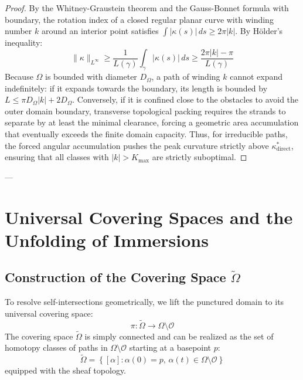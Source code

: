 \documentclass[11pt,reqno]{amsart}
\theoremstyle{definition}
\newcommand{\Cover}{\widetilde{\Omega}}
\numberwithin{equation}{section}
\begin{document}
\begin{proof}
By the Whitney-Graustein theorem \cite{whitney1936} and the Gauss-Bonnet formula with boundary, the rotation index of a closed regular planar curve with winding number $k$ around an interior point satisfies $\int |\kappa(s)|\,ds \ge 2\pi |k|$. 
By H\"older's inequality:
\begin{equation}
\|\kappa\|_{L^\infty} \ge \frac{1}{L(\gamma)} \int_\gamma |\kappa(s)|\,ds \ge \frac{2\pi |k| - \pi}{L(\gamma)}
\end{equation}
Because $\Omega$ is bounded with diameter $D_{\Omega}$, a path of winding $k$ cannot expand indefinitely: if it expands towards the boundary, its length is bounded by $L \le \pi D_{\Omega} |k| + 2 D_{\Omega}$. Conversely, if it is confined close to the obstacles to avoid the outer domain boundary, transverse topological packing requires the strands to separate by at least the minimal clearance, forcing a geometric area accumulation that eventually exceeds the finite domain capacity. Thus, for irreducible paths, the forced angular accumulation pushes the peak curvature strictly above $\kappa^*_{\mathrm{direct}}$, ensuring that all classes with $|k| > K_{\max}$ are strictly suboptimal.
\end{proof}

---

\section{Universal Covering Spaces and the Unfolding of Immersions}

\subsection{Construction of the Covering Space \texorpdfstring{$\Cover$}{Omega-tilde}}
To resolve self-intersections geometrically, we lift the punctured domain to its universal covering space:
\begin{equation}
\pi: \Cover \to \Omega \setminus \mathcal{O}
\end{equation}
The covering space $\Cover$ is simply connected and can be realized as the set of homotopy classes of paths in $\Omega \setminus \mathcal{O}$ starting at a basepoint $p$:
\begin{equation}
\Cover = \left\{ [\alpha] : \alpha(0) = p, \, \alpha(t) \in \Omega \setminus \mathcal{O} \right\}
\end{equation}
equipped with the sheaf topology.
\end{document}
